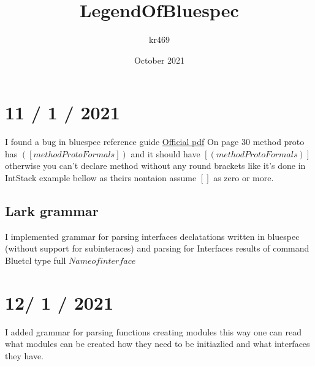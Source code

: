 \documentclass{article}
\title{LegendOfBluespec}
\author{kr469 }
\date{October 2021}
\begin{document}
\maketitle

\section{11 / 1 / 2021}
    I found a bug in bluespec reference guide
    \hyperlink{https://github.com/BSVLang/Main/blob/master/Language_Spec/bsv-reference-guide.pdf}{Official pdf}
    On page 30 method proto has $([ methodProtoFormals ])$ 
    and it should have $[( methodProtoFormals)]$ 
    otherwise you can't declare method without any round brackets like it's done in IntStack example bellow
    as theirs nontaion assume $[]$ as zero or more. 

    \subsection{Lark grammar}
         I implemented grammar for parsing interfaces declatations written in bluespec (without support for subinteraces)
         and parsing for Interfaces results of command Bluetcl type full \( Name of interface \)

\section{12/ 1 / 2021}
    I added grammar for parsing functions creating modules this way one can 
    read what modules can be created how they need to be initiazlied and what interfaces they have.  
\end{document}
